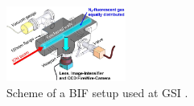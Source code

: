 \begin{figure}
  \begin{center}
		\includegraphics[width=0.35\textwidth]{02_BeamDiag/figures/fig000_FPM}
	\end{center}
	\caption[Scheme of a BIF setup used at GSI.]{Scheme of a BIF setup used at GSI \cite{ForkJUAS}.}
	\label{chap3:fig:FPM}
\end{figure}

